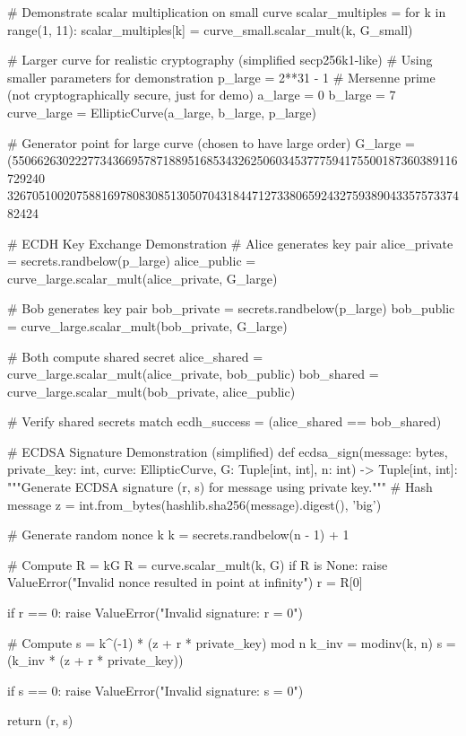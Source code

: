 \documentclass[a4paper, 11pt]{article}
\begin{document}
\begin{pycode}
# Demonstrate scalar multiplication on small curve
scalar_multiples = {}
for k in range(1, 11):
    scalar_multiples[k] = curve_small.scalar_mult(k, G_small)

# Larger curve for realistic cryptography (simplified secp256k1-like)
# Using smaller parameters for demonstration
p_large = 2**31 - 1  # Mersenne prime (not cryptographically secure, just for demo)
a_large = 0
b_large = 7
curve_large = EllipticCurve(a_large, b_large, p_large)

# Generator point for large curve (chosen to have large order)
G_large = (55066263022277343669578718895168534326250603453777594175500187360389116729240 %
           32670510020758816978083085130507043184471273380659243275938904335757337482424 %

# ECDH Key Exchange Demonstration
# Alice generates key pair
alice_private = secrets.randbelow(p_large)
alice_public = curve_large.scalar_mult(alice_private, G_large)

# Bob generates key pair
bob_private = secrets.randbelow(p_large)
bob_public = curve_large.scalar_mult(bob_private, G_large)

# Both compute shared secret
alice_shared = curve_large.scalar_mult(alice_private, bob_public)
bob_shared = curve_large.scalar_mult(bob_private, alice_public)

# Verify shared secrets match
ecdh_success = (alice_shared == bob_shared)

# ECDSA Signature Demonstration (simplified)
def ecdsa_sign(message: bytes, private_key: int, curve: EllipticCurve, G: Tuple[int, int], n: int) -> Tuple[int, int]:
    """Generate ECDSA signature (r, s) for message using private key."""
    # Hash message
    z = int.from_bytes(hashlib.sha256(message).digest(), 'big') %

    # Generate random nonce k
    k = secrets.randbelow(n - 1) + 1

    # Compute R = kG
    R = curve.scalar_mult(k, G)
    if R is None:
        raise ValueError("Invalid nonce resulted in point at infinity")
    r = R[0] %

    if r == 0:
        raise ValueError("Invalid signature: r = 0")

    # Compute s = k^(-1) * (z + r * private_key) mod n
    k_inv = modinv(k, n)
    s = (k_inv * (z + r * private_key)) %

    if s == 0:
        raise ValueError("Invalid signature: s = 0")

    return (r, s)


\end{pycode}
\end{document}
